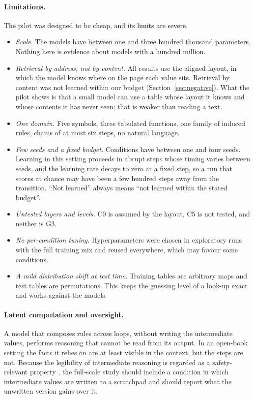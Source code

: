 \paragraph{Limitations.}
The pilot was designed to be cheap, and its limits are severe.
\begin{itemize}
\item \emph{Scale.} The models have between one and three hundred thousand parameters. Nothing here is evidence about models with a hundred million.
\item \emph{Retrieval by address, not by content.} All results use the aligned layout, in which the model knows where on the page each value sits. Retrieval by content was not learned within our budget (Section~\ref{sec:negative}). What the pilot shows is that a small model can use a table whose layout it knows and whose contents it has never seen; that is weaker than reading a text.
\item \emph{One domain.} Five symbols, three tabulated functions, one family of induced rules, chains of at most six steps, no natural language.
\item \emph{Few seeds and a fixed budget.} Conditions have between one and four seeds. Learning in this setting proceeds in abrupt steps whose timing varies between seeds, and the learning rate decays to zero at a fixed step, so a run that scores at chance may have been a few hundred steps away from the transition. ``Not learned'' always means ``not learned within the stated budget''.
\item \emph{Untested layers and levels.} C0 is assumed by the layout, C5 is not tested, and neither is G3.
\item \emph{No per-condition tuning.} Hyperparameters were chosen in exploratory runs with the full training mix and reused everywhere, which may favour some conditions.
\item \emph{A mild distribution shift at test time.} Training tables are arbitrary maps and test tables are permutations. This keeps the guessing level of a look-up exact and works against the models.
\end{itemize}

\paragraph{Latent computation and oversight.}
A model that composes rules across loops, without writing the intermediate values, performs reasoning that cannot be read from its output.
In an open-book setting the facts it relies on are at least visible in the context, but the steps are not.
Because the legibility of intermediate reasoning is regarded as a safety-relevant property \citep{korbak2025monitorability}, the full-scale study should include a condition in which intermediate values are written to a scratchpad \citep{nye2021scratchpad} and should report what the unwritten version gains over it.

